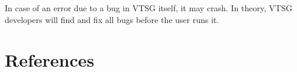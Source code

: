 In case of an error due to a bug in VTSG itself, it may crash.  In theory, VTSG
developers will find and fix all bugs before the user runs it.



\section*{References}



%
%

\clearpage


